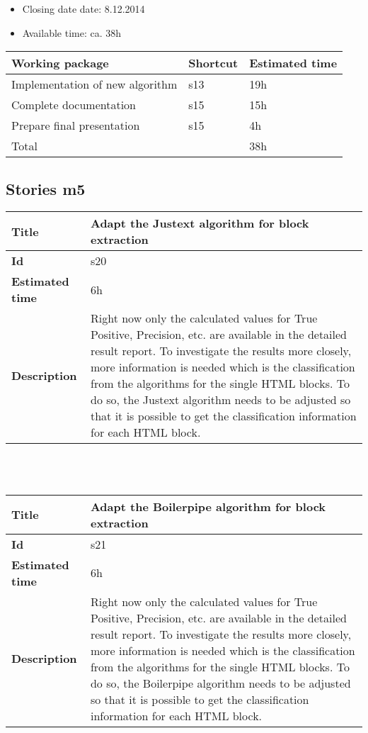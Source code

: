 \begin{itemize}
\item Closing date date: 8.12.2014
\item Available time: ca. 38h
\end{itemize}

    \begin{tabular}{ | p{10cm} | p{2cm} | p{2cm} |}
    \hline
    \textbf{Working package} & \textbf{Shortcut}& \textbf{Estimated time} \\ \hline
    Implementation of new algorithm & s13 & 19h \\
    Complete documentation & s15 & 15h \\
    Prepare final presentation & s15 & 4h \\ \hline
    Total &  & 38h\\
    \hline
    \end{tabular}

\subsection {Stories m5}

    \begin{tabular}{ | p{4cm} | p{10cm} |}
    \hline
    \textbf{Title} & Adapt the Justext algorithm for block extraction\\ \hline
    \textbf{Id} & s20\\ \hline
    \textbf{Estimated time} & 6h \\ \hline
    \textbf{Description} &  Right now only the calculated values for True Positive, Precision, etc. are available in the detailed result report. To investigate the results more closely, more information is needed which is the classification from the algorithms for the single HTML blocks. To do so, the Justext algorithm needs to be adjusted so that it is possible to get the classification information for each HTML block.\\ 
    \hline
    \end{tabular} \\\\

    \begin{tabular}{ | p{4cm} | p{10cm} |}
    \hline
    \textbf{Title} & Adapt the Boilerpipe algorithm for block extraction\\ \hline
    \textbf{Id} & s21\\ \hline
    \textbf{Estimated time} & 6h \\ \hline
    \textbf{Description} &  Right now only the calculated values for True Positive, Precision, etc. are available in the detailed result report. To investigate the results more closely, more information is needed which is the classification from the algorithms for the single HTML blocks. To do so, the Boilerpipe algorithm needs to be adjusted so that it is possible to get the classification information for each HTML block.\\ 
    \hline
    \end{tabular} \\\\


